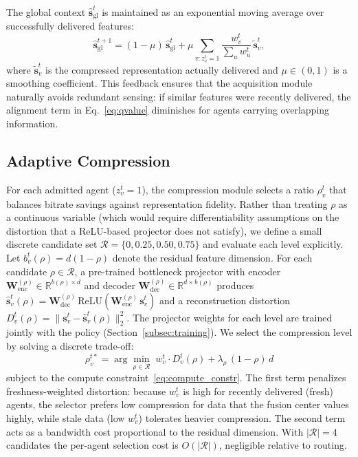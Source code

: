 \documentclass[final,3p,times,review,sort&compress]{elsarticle}
\begin{document}
The global context $\hat{\mathbf{s}}_{\mathrm{gl}}^t$ is maintained as an exponential moving average over successfully delivered features:
\begin{equation}
\hat{\mathbf{s}}_{\mathrm{gl}}^{t+1} = (1-\mu)\,\hat{\mathbf{s}}_{\mathrm{gl}}^t + \mu\sum_{v:z_v^t=1} \frac{w_v^t}{\sum_{u}w_u^t}\,\tilde{\mathbf{s}}_v^t,
\label{eq:global_ctx}
\end{equation}
where $\tilde{\mathbf{s}}_v^t$ is the compressed representation actually delivered and $\mu\in(0,1)$ is a smoothing coefficient. This feedback ensures that the acquisition module naturally avoids redundant sensing: if similar features were recently delivered, the alignment term in Eq.~\ref{eq:qvalue} diminishes for agents carrying overlapping information.

\subsection{Adaptive Compression}
\label{subsec:compression}

For each admitted agent ($z_v^t=1$), the compression module selects a ratio $\rho_v^t$ that balances bitrate savings against representation fidelity. Rather than treating $\rho$ as a continuous variable (which would require differentiability assumptions on the distortion that a ReLU-based projector does not satisfy), we define a small discrete candidate set $\mathcal{R} = \{0, 0.25, 0.50, 0.75\}$ and evaluate each level explicitly. Let $b_v^t(\rho) = d(1-\rho)$ denote the residual feature dimension. For each candidate $\rho\in\mathcal{R}$, a pre-trained bottleneck projector with encoder $\mathbf{W}_{\mathrm{enc}}^{(\rho)}\in\mathbb{R}^{b(\rho)\times d}$ and decoder $\mathbf{W}_{\mathrm{dec}}^{(\rho)}\in\mathbb{R}^{d\times b(\rho)}$ produces $\hat{\mathbf{s}}_v^t(\rho) = \mathbf{W}_{\mathrm{dec}}^{(\rho)}\,\mathrm{ReLU}(\mathbf{W}_{\mathrm{enc}}^{(\rho)}\,\mathbf{s}_v^t)$ and a reconstruction distortion $D_v^t(\rho) = \|\mathbf{s}_v^t - \hat{\mathbf{s}}_v^t(\rho)\|_2^2$. The projector weights for each level are trained jointly with the policy (Section~\ref{subsec:training}). We select the compression level by solving a discrete trade-off:
\begin{equation}
\rho_v^{t*} = \arg\min_{\rho\in\mathcal{R}} \; w_v^t \cdot D_v^t(\rho) + \lambda_\rho\,(1-\rho)\,d
\label{eq:knapsack}
\end{equation}
subject to the compute constraint~\eqref{eq:compute_constr}. The first term penalizes freshness-weighted distortion: because $w_v^t$ is high for recently delivered (fresh) agents, the selector prefers low compression for data that the fusion center values highly, while stale data (low $w_v^t$) tolerates heavier compression. The second term acts as a bandwidth cost proportional to the residual dimension. With $|\mathcal{R}|=4$ candidates the per-agent selection cost is $O(|\mathcal{R}|)$, negligible relative to routing.
\end{document}
